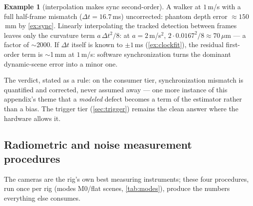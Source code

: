 \documentclass[11pt]{article}
\theoremstyle{definition}
\newtheorem{example}{Example}
\begin{document}
\begin{example}[interpolation makes sync second-order]
\label{ex:interp}
A walker at $1$\,m/s with a full half-frame mismatch
($\Delta t=16.7$\,ms) uncorrected: phantom depth error
$\approx150$\,mm by \autoref{ex:sync}. Linearly interpolating the
tracked detection between frames leaves only the curvature term
$a\,\Delta t^2/8$: at $a=2$\,m/s$^2$,
$2\cdot0.0167^2/8\approx70\,\mu$m --- a factor of $\sim$2000. If
$\Delta t$ itself is known to $\pm1$\,ms (\autoref{ex:clockfit}), the
residual first-order term is $\sim$1\,mm at $1$\,m/s: software
synchronization turns the dominant dynamic-scene error into a minor one.
\end{example}

The verdict, stated as a rule: on the consumer tier, synchronization
mismatch is quantified and corrected, never assumed away --- one more
instance of this appendix's theme that a \emph{modeled} defect becomes a
term of the estimator rather than a bias. The trigger tier
(\autoref{sec:trigger}) remains the clean answer where the hardware
allows it.

\subsection{Radiometric and noise measurement procedures}
\label{sec:radiometry}

The cameras are the rig's own best measuring instruments; these four
procedures, run once per rig (modes M0/flat scenes,
\autoref{tab:modes}), produce the numbers everything else consumes.
\end{document}
